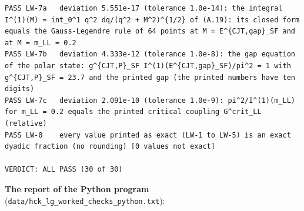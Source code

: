 \documentclass[
  10pt,
]{article}
\begin{document}
\begin{verbatim}
PASS LW-7a   deviation 5.551e-17 (tolerance 1.0e-14): the integral I^(1)(M) = int_0^1 q^2 dq/(q^2 + M^2)^{1/2} of (A.19): its closed form equals the Gauss-Legendre rule of 64 points at M = E^{CJT,gap}_SF and at M = m_LL = 0.2
PASS LW-7b   deviation 4.333e-12 (tolerance 1.0e-8): the gap equation of the polar state: g^{CJT,P}_SF I^(1)(E^{CJT,gap}_SF)/pi^2 = 1 with g^{CJT,P}_SF = 23.7 and the printed gap (the printed numbers have ten digits)
PASS LW-7c   deviation 2.091e-10 (tolerance 1.0e-9): pi^2/I^(1)(m_LL) for m_LL = 0.2 equals the printed critical coupling G^crit_LL (relative)
PASS LW-0    every value printed as exact (LW-1 to LW-5) is an exact dyadic fraction (no rounding) [0 values not exact]

VERDICT: ALL PASS (30 of 30)
\end{verbatim}

\textbf{The report of the Python program}
(\texttt{data/hck\_lg\_worked\_checks\_python.txt}):
\end{document}
